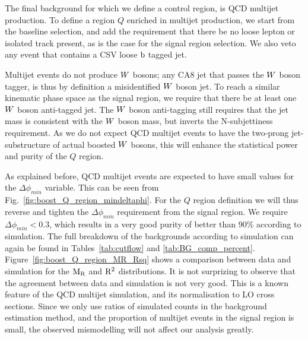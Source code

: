 The final background for which we define a control region, is QCD multijet production.
To define a region $Q$ enriched in multijet production, we start from the baseline selection, and
add the requirement that there be no loose lepton or isolated track present, as is the case for the
signal region selection. We also veto any event that contains a CSV loose $\mathrm{b}$ tagged jet. 

Multijet events do not produce $W$ bosons; any CA8 jet that passes the $W$ boson tagger,
is thus by definition a misidentified $W$ boson jet. To reach a similar kinematic phase space as
the signal region, we require that there be at least one $W$ boson anti-tagged jet. The $W$ boson
anti-tagging still requires that the jet mass is consistent with the $W$ boson mass, but inverts
the N-subjettiness requirement. As we do not expect QCD multijet events to have the two-prong
jet-substructure of actual boosted $W$ bosons, this will enhance the statistical power and purity
of the $Q$ region. 

As explained before, QCD multijet events are expected to have small values for the
$\Delta\phi_{min}$ variable. This can be seen from Fig.~\ref{fig:boost_Q_region_mindeltaphi}. 
For the $Q$ region definition we will thus reverse
and tighten the $\Delta\phi_{min}$ requirement from the signal region. We require $\Delta\phi_{min}
< 0.3$, which results in a very good purity of better than 90\% according to simulation. 
The full breakdown of the backgrounds according to simulation can again be found in
Tables~\ref{tab:cutflow} and \ref{tab:BG_comp_percent}.
Figure~\ref{fig:boost_Q_region_MR_Rsq} shows a comparison between data and simulation for the $\mathrm{M_R}$
and $\mathrm{R^2}$ distributions. It is not surprizing to observe that the agreement between data and
simulation is not very good. This is a known feature of the QCD multijet simulation, and its
normalisation to LO cross sections. Since we only use ratios of simulated counts in the background
estimation method, and the proportion of multijet events in the signal region is small, the
observed mismodelling will not affect our analysis greatly. 

